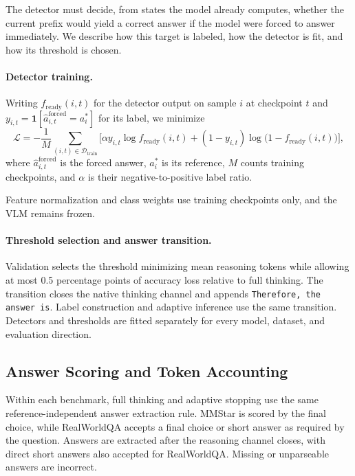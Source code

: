 \documentclass{article} %
\begin{document}
The detector must decide, from states the model already computes, whether the current prefix would yield a correct answer if the model were forced to answer immediately. We describe how this target is labeled, how the detector is fit, and how its threshold is chosen.

\paragraph{Detector training.}
Writing $f_{\mathrm{ready}}(i,t)$ for the detector output on sample $i$ at checkpoint $t$ and $y_{i,t}=\mathbf{1}[\hat a_{i,t}^{\mathrm{forced}}=a_i^*]$ for its label, we minimize
\begin{equation}
    \mathcal L=-\frac{1}{M}\sum_{(i,t)\in\mathcal D_{\mathrm{train}}}
    \bigl[\alpha y_{i,t}\log f_{\mathrm{ready}}(i,t)
    +(1-y_{i,t})\log\bigl(1-f_{\mathrm{ready}}(i,t)\bigr)\bigr],
\end{equation}
where $\hat a_{i,t}^{\mathrm{forced}}$ is the forced answer, $a_i^*$ is its reference, $M$ counts training checkpoints, and $\alpha$ is their negative-to-positive label ratio.

Feature normalization and class weights use training checkpoints only, and the VLM remains frozen.

\paragraph{Threshold selection and answer transition.}
Validation selects the threshold minimizing mean reasoning tokens while allowing at most 0.5 percentage points of accuracy loss relative to full thinking. The transition closes the native thinking channel and appends \texttt{Therefore, the answer is}. Label construction and adaptive inference use the same transition. Detectors and thresholds are fitted separately for every model, dataset, and evaluation direction.

\subsection{Answer Scoring and Token Accounting}

Within each benchmark, full thinking and adaptive stopping use the same reference-independent answer extraction rule. MMStar is scored by the final choice, while RealWorldQA accepts a final choice or short answer as required by the question. Answers are extracted after the reasoning channel closes, with direct short answers also accepted for RealWorldQA. Missing or unparseable answers are incorrect.
\end{document}
